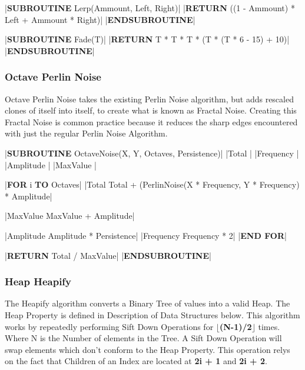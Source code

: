 \begin{flushleft}
\begin{pseudocode}
|\textbf{SUBROUTINE} Lerp(Ammount, Left, Right)|
    |\textbf{RETURN} ((1 - Ammount) * Left + Ammount * Right)|
|\textbf{ENDSUBROUTINE}|

|\textbf{SUBROUTINE} Fade(T)|
    |\textbf{RETURN} T * T * T * (T * (T * 6 - 15) + 10)|
|\textbf{ENDSUBROUTINE}|
                \end{pseudocode}

                \vspace{0.5cm}
            \subsubsection{Octave Perlin Noise}
                Octave Perlin Noise takes the existing Perlin Noise algorithm, but adds rescaled clones of itself into itself, to create
                what is known as Fractal Noise. Creating this Fractal Noise is common practice because it reduces the sharp edges encountered
                with just the regular Perlin Noise Algorithm.

                \vspace{0.2cm}
                \begin{pseudocode}
|\textbf{SUBROUTINE} OctaveNoise(X, Y, Octaves, Persistence)|
    |Total |
    |Frequency |
    |Amplitude |
    |MaxValue |

    |\textbf{FOR} i  \textbf{TO} Octaves|
        |Total \leftarrow Total + (PerlinNoise(X * Frequency, Y * Frequency) * Amplitude|

        |MaxValue \leftarrow MaxValue + Amplitude|

        |Amplitude \leftarrow Amplitude * Persistence|
        |Frequency \leftarrow Frequency * 2|
    |\textbf{END FOR}|

    |\textbf{RETURN} Total / MaxValue|
|\textbf{ENDSUBROUTINE}|            
                \end{pseudocode}

            \subsubsection{Heap Heapify}
                The Heapify algorithm converts a Binary Tree of values into a valid Heap. The Heap Property is defined in Description of Data
                Structures below. This algorithm works by repeatedly performing Sift Down Operations for \textbf{$\lfloor$(N-1)/2$\rfloor$} times.
                Where N is the Number of elements in the Tree. A Sift Down Operation will swap elements which don't conform to the Heap Property.
                This operation relys on the fact that Children of an Index are located at \textbf{2i + 1} and \textbf{2i + 2}.
                \vspace{0.2cm}


\end{flushleft}
